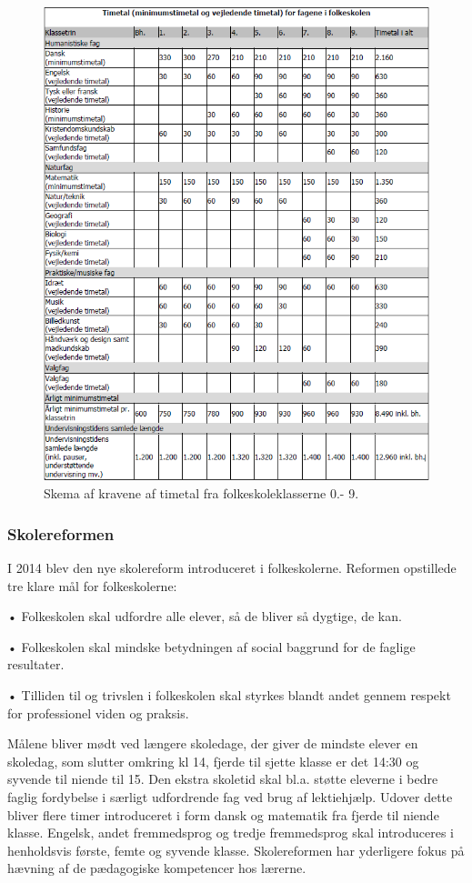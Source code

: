 \begin{figure}[!ht]
  \centering
  \includegraphics[width=\textwidth]{partials/graphics/overallskemaovertimetal.png}
  \caption{Skema af kravene af timetal fra folkeskoleklasserne 0.- 9.}
  \label{fig:Timetal}
\end{figure}
 	
\subsubsection{Skolereformen}
I 2014 blev den nye skolereform introduceret i folkeskolerne. Reformen opstillede tre klare mål for folkeskolerne:

•	Folkeskolen skal udfordre alle elever, så de bliver så dygtige, de kan.

•	Folkeskolen skal mindske betydningen af social baggrund for de faglige resultater.

•	Tilliden til og trivslen i folkeskolen skal styrkes blandt andet gennem respekt for professionel viden og praksis.

Målene bliver mødt ved længere skoledage, der giver de mindste elever en skoledag, som slutter omkring kl 14, fjerde til sjette klasse er det 14:30 og syvende til niende til 15. Den ekstra skoletid skal bl.a. støtte eleverne i bedre faglig fordybelse i særligt udfordrende fag ved brug af lektiehjælp. Udover dette bliver flere timer introduceret i form dansk og matematik fra fjerde til niende klasse. Engelsk, andet fremmedsprog og tredje fremmedsprog skal introduceres i henholdsvis første, femte og syvende klasse.
Skolereformen har yderligere fokus på hævning af de pædagogiske kompetencer hos lærerne.
